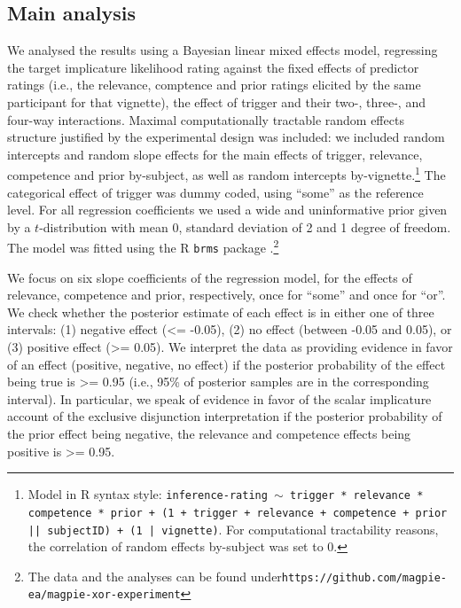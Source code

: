 \documentclass{sp}
\begin{document}
\subsection{Main analysis}
We analysed the results using a Bayesian linear mixed effects model, regressing the target implicature likelihood rating against the fixed effects of predictor ratings (i.e., the relevance, comptence and prior ratings elicited by the same participant for that vignette), the effect of trigger and their two-, three-, and four-way interactions. Maximal computationally tractable random effects structure justified by the experimental design was included: we included random intercepts and random slope effects for the main effects of trigger, relevance, competence and prior by-subject, as well as random intercepts by-vignette.\footnote{Model in R syntax style: \texttt{inference-rating $\sim$ trigger * relevance * competence * prior + (1 + trigger + relevance + competence + prior || subjectID) + (1 | vignette)}. For computational tractability reasons, the correlation of random effects by-subject was set to 0.} 
The categorical effect of trigger was dummy coded, using ``some'' as the reference level. For all regression coefficients we used a wide and uninformative prior given by a $t$-distribution with mean 0, standard deviation of 2 and 1 degree of freedom. The model was fitted using the R \texttt{brms} package \citep{burkner2017brms}.\footnote{The data and the analyses can be found under\newline \texttt{https://github.com/magpie-ea/magpie-xor-experiment}}

We focus on six slope coefficients of the regression model, for the effects of relevance, competence and prior, respectively, once for ``some'' and once for ``or''. We check whether the posterior estimate of each effect is in either one of three intervals: (1) negative effect (<= -0.05), (2) no effect (between -0.05 and 0.05), or (3) positive effect (>= 0.05). 
We interpret the data as providing evidence in favor of an effect (positive, negative, no effect) if the posterior probability of the effect being true is >= 0.95 (i.e., 95\% of posterior samples are in the corresponding interval). In particular, we speak of evidence in favor of the scalar implicature account of the exclusive disjunction interpretation if the posterior probability of the prior effect being negative, the relevance and competence effects being positive is >= 0.95. 
\end{document}
